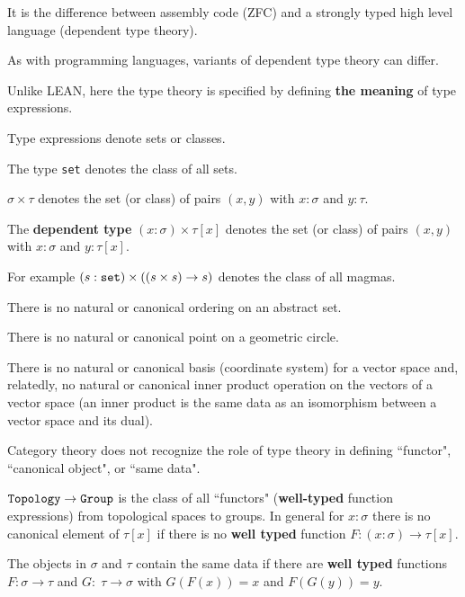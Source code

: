 {\vfill
It is the difference between assembly code (ZFC) and a strongly typed high level language (dependent type theory).

\vfill
As with programming languages, variants of dependent type theory can differ.


Unlike LEAN, here the type theory is specified by defining {\bf the meaning} of type expressions.

\vfill
Type expressions denote sets or classes.

\vfill
The type {\tt set} denotes the class of all sets.

\vfill
$\sigma \times \tau$
denotes the set (or class) of pairs $(x,y)$ with $x\!:\!\sigma$ and $y\!:\!\tau$.

\vfill
The {\bf dependent type}  $(x:\sigma) \times \tau[x]$ denotes the set (or class) of pairs $(x,y)$ with $x\!:\!\sigma$ and $y\!:\!\tau[x]$.

\vfill
For example $(s:{\tt set}) \times ((s \times s) \rightarrow s)$ denotes the class of all magmas.


There is no natural or canonical ordering  on an abstract set.

\vfill
There is no natural or canonical point on a geometric circle.

\vfill
There is no natural or canonical basis (coordinate system) for a vector space and, relatedly,  no natural or canonical inner product operation on the vectors of a vector space (an inner product is the same data as an isomorphism between a vector space and its dual).




Category theory does not recognize the role of type theory in defining ``functor", ``canonical object", or ``same data".

\vfill
${\tt Topology}\rightarrow {\tt Group}$ is the class of all ``functors" ({\bf well-typed} function expressions) from topological spaces to groups.
\vfill
In general for $x:\sigma$ there is no canonical element of $\tau[x]$ if there is no {\bf well typed} function $F:(x:\sigma)\rightarrow \tau[x]$.

\vfill
The objects in $\sigma$ and $\tau$ contain the same data if there are {\bf well typed} functions $F:\sigma\rightarrow \tau$ and $G:\;\tau\rightarrow \sigma$ with $G(F(x)) = x$ and $F(G(y)) = y$.

}
